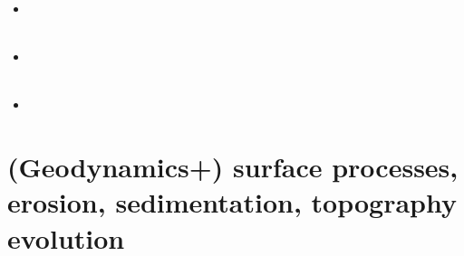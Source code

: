 \begin{scriptsize}
\begin{itemize}
\textcite{dusd18} \\
\textcite{mosp18} \\
\item[\twothousandnineteen] 
\textcite{pact19} \\
\textcite{halk19} \\
\item[\twothousandtwenty] 
\textcite{sams20} \\
\textcite{lahh20} \\
\item[\twothousandtwentytwo] 
\textcite{wecn22} \\
\end{itemize}
\end{scriptsize}

\section{(Geodynamics+) surface processes, erosion, sedimentation, topography evolution}

